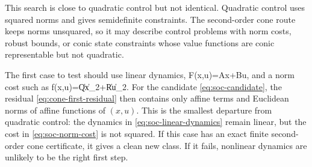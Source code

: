 \documentclass{article}
\begin{document}
This search is close to quadratic control but not identical. Quadratic control uses squared norms and gives semidefinite constraints. The second-order cone route keeps norms unsquared, so it may describe control problems with norm costs, robust bounds, or conic state constraints whose value functions are conic representable but not quadratic.

The first case to test should use linear dynamics,
\BEQ
F(x,u)=Ax+Bu,
\label{eq:soc-linear-dynamics}
\EEQ
and a norm cost such as
\BEQ
f(x,u)=\|Qx\|_2+\|Ru\|_2.
\label{eq:soc-norm-cost}
\EEQ
For the candidate \eqref{eq:soc-candidate}, the residual \eqref{eq:cone-first-residual} then contains only affine terms and Euclidean norms of affine functions of $(x,u)$. This is the smallest departure from quadratic control: the dynamics in \eqref{eq:soc-linear-dynamics} remain linear, but the cost in \eqref{eq:soc-norm-cost} is not squared. If this case has an exact finite second-order cone certificate, it gives a clean new class. If it fails, nonlinear dynamics are unlikely to be the right first step.
\end{document}

